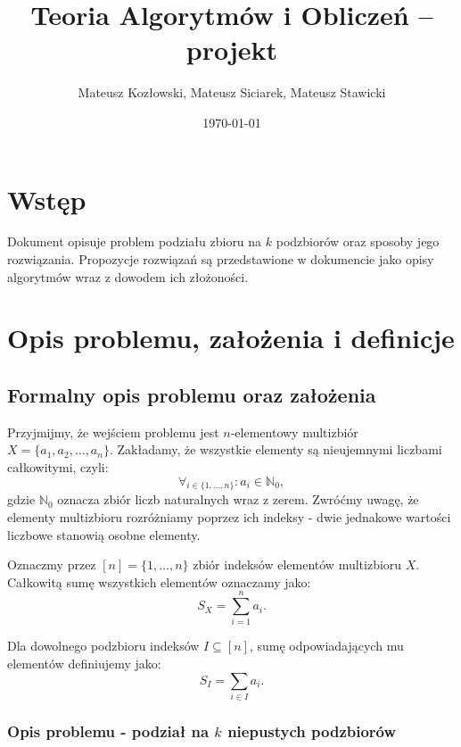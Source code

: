 \documentclass[11pt]{article}
\title{Teoria Algorytmów i Obliczeń -- projekt}
\author{Mateusz Kozłowski, Mateusz Siciarek, Mateusz Stawicki}
\date{\today}
\begin{document}
\maketitle

\tableofcontents
\newpage

\section{Wstęp}

Dokument opisuje problem podziału zbioru na \(k\) podzbiorów oraz sposoby jego rozwiązania. Propozycje rozwiązań są przedstawione w dokumencie jako opisy algorytmów wraz z dowodem ich złożoności. 

\section{Opis problemu, założenia i definicje}

\subsection{Formalny opis problemu oraz założenia}

Przyjmijmy, że wejściem problemu jest $n$-elementowy multizbiór $X = \{a_1, a_2, \dots, a_n\}$. Zakładamy, że wszystkie elementy są nieujemnymi liczbami całkowitymi, czyli:
\begin{equation}
    \forall_{i \in \{1, \dots, n\}} : a_i \in \mathbb{N}_0,
    \label{eq:positive_elems}
\end{equation}
gdzie $\mathbb{N}_0$ oznacza zbiór liczb naturalnych wraz z zerem. Zwróćmy uwagę, że elementy multizbioru rozróżniamy poprzez ich indeksy - dwie jednakowe wartości liczbowe stanowią osobne elementy.

Oznaczmy przez $[n] = \{1, \dots, n\}$ zbiór indeksów elementów multizbioru $X$. Całkowitą sumę wszystkich elementów oznaczamy jako:
\begin{equation}
    S_X = \sum_{i=1}^n a_i.
\end{equation}

Dla dowolnego podzbioru indeksów $I \subseteq [n]$, sumę odpowiadających mu elementów definiujemy jako:
\begin{equation}
    S_I = \sum_{i \in I} a_i.
\end{equation}

\subsubsection{Opis problemu - podział na $k$ niepustych podzbiorów}
\end{document}
